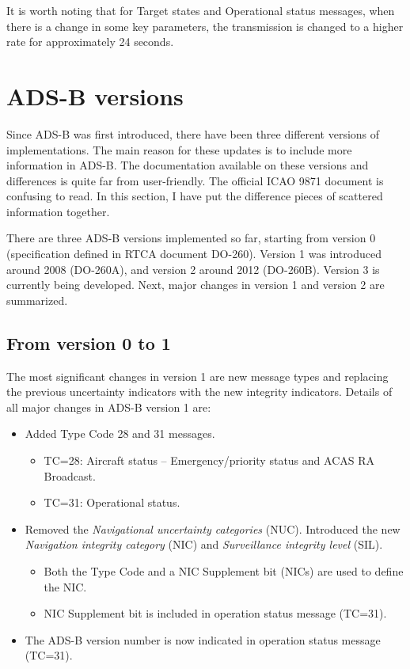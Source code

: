 It is worth noting that for Target states and Operational status messages, when there is a change in some key parameters, the transmission is changed to a higher rate for approximately 24 seconds.




\section{ADS-B versions}

Since ADS-B was first introduced, there have been three different versions of implementations. The main reason for these updates is to include more information in ADS-B. The documentation available on these versions and differences is quite far from user-friendly. The official ICAO 9871 document \cite{icao9871v1} is confusing to read. In this section, I have put the difference pieces of scattered information together.

There are three ADS-B versions implemented so far, starting from version 0 (specification defined in RTCA document DO-260). Version 1 was introduced around 2008 (DO-260A), and version 2 around 2012 (DO-260B). Version 3 is currently being developed. Next, major changes in version 1 and version 2 are summarized.

\subsection{From version 0 to 1}

The most significant changes in version 1 are new message types and replacing the previous uncertainty indicators with the new integrity indicators. Details of all major changes in ADS-B version 1 are:

\begin{itemize}
  \item Added Type Code 28 and 31 messages.

  \begin{itemize}
    \item TC=28: Aircraft status -- Emergency/priority status and ACAS RA Broadcast.
    \item TC=31: Operational status.
  \end{itemize}

  \item Removed the \emph{Navigational uncertainty categories} (NUC). Introduced the new \emph{Navigation integrity category} (NIC) and \emph{Surveillance integrity level} (SIL).

  \begin{itemize}
    \item Both the Type Code and a NIC Supplement bit (NICs) are used to define the NIC.
    \item NIC Supplement bit is included in operation status message (TC=31).
  \end{itemize}

  \item The ADS-B version number is now indicated in operation status message (TC=31).
\end{itemize}

